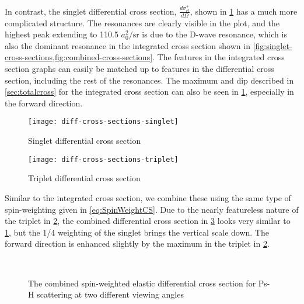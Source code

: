 \documentclass[Dissertation.tex]{subfiles}
\begin{document}
In contrast, the singlet differential cross section, $\frac{d\sigma_{el}^+}{d\Omega}$,
shown in \cref{fig:diff-cross-sections-singlet} has a much more complicated
structure. The resonances are clearly visible in the plot, and the highest peak
extending to 110.5 $a_0^2/\textrm{sr}$ is due to the D-wave resonance, which is
also the dominant resonance in the integrated cross section shown in
\cref{fig:singlet-cross-sections,fig:combined-cross-sections}. The features in
the integrated cross section graphs can easily be matched up to features in the
differential cross section, including the rest of the resonances. The maximum
and dip described in \cref{sec:totalcross} for the integrated cross section can
also be seen in \cref{fig:diff-cross-sections-singlet}, especially in the
forward direction.

\begin{figure}
	\centering
	\texttt{[image: diff-cross-sections-singlet]}
	\caption{Singlet differential cross section}
	\label{fig:diff-cross-sections-singlet}
\end{figure}

\begin{figure}
	\centering
	\texttt{[image: diff-cross-sections-triplet]}
	\caption{Triplet differential cross section}
	\label{fig:diff-cross-sections-triplet}
\end{figure}

Similar to the integrated cross section, we combine these using the same type
of spin-weighting given in \cref{eq:SpinWeightCS}. Due to the nearly featureless
nature of the triplet in \cref{fig:diff-cross-sections-triplet},
the combined differential cross section in 
\cref{fig:combined-diff-cross-sections} looks very similar to 
\cref{fig:diff-cross-sections-singlet}, but the 1/4 weighting of the singlet
brings the vertical scale down. The forward direction is enhanced slightly by
the maximum in the triplet in \cref{fig:diff-cross-sections-triplet}.

\begin{figure}
    \centering
     \\%
    \caption[The combined spin-weighted elastic differential cross section]{The combined spin-weighted elastic differential cross section for Ps-H scattering at two different viewing angles}%
    \label{fig:combined-diff-cross-sections}%
\end{figure}
\end{document}
